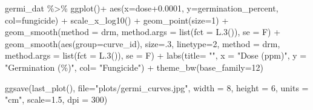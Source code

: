 \documentclass[
  letterpaper,
  DIV=11,
  numbers=noendperiod]{scrreport}
\newenvironment{Shaded}{\begin{snugshade}}{\end{snugshade}}
\newcommand{\AttributeTok}[1]{\textcolor[rgb]{0.40,0.45,0.13}{#1}}
\newcommand{\DecValTok}[1]{\textcolor[rgb]{0.68,0.00,0.00}{#1}}
\newcommand{\FloatTok}[1]{\textcolor[rgb]{0.68,0.00,0.00}{#1}}
\newcommand{\FunctionTok}[1]{\textcolor[rgb]{0.28,0.35,0.67}{#1}}
\newcommand{\NormalTok}[1]{\textcolor[rgb]{0.00,0.23,0.31}{#1}}
\newcommand{\SpecialCharTok}[1]{\textcolor[rgb]{0.37,0.37,0.37}{#1}}
\newcommand{\StringTok}[1]{\textcolor[rgb]{0.13,0.47,0.30}{#1}}
\begin{document}
\begin{Shaded}
\begin{Highlighting}[]
\NormalTok{germi\_dat }\SpecialCharTok{\%\textgreater{}\%} 
  \FunctionTok{ggplot}\NormalTok{()}\SpecialCharTok{+}
  \FunctionTok{aes}\NormalTok{(}\AttributeTok{x=}\NormalTok{dose}\FloatTok{+0.0001}\NormalTok{, }\AttributeTok{y=}\NormalTok{germination\_percent, }\AttributeTok{col=}\NormalTok{fungicide) }\SpecialCharTok{+}
  \FunctionTok{scale\_x\_log10}\NormalTok{() }\SpecialCharTok{+}
  \FunctionTok{geom\_point}\NormalTok{(}\AttributeTok{size=}\DecValTok{1}\NormalTok{) }\SpecialCharTok{+} 
  \FunctionTok{geom\_smooth}\NormalTok{(}\AttributeTok{method =}\NormalTok{ drm, }
              \AttributeTok{method.args =} \FunctionTok{list}\NormalTok{(}\AttributeTok{fct =} \FunctionTok{L.3}\NormalTok{()), }\AttributeTok{se =}\NormalTok{ F) }\SpecialCharTok{+}  
  \FunctionTok{geom\_smooth}\NormalTok{(}\FunctionTok{aes}\NormalTok{(}\AttributeTok{group=}\NormalTok{curve\_id), }\AttributeTok{size=}\NormalTok{.}\DecValTok{3}\NormalTok{, }\AttributeTok{linetype=}\DecValTok{2}\NormalTok{,  }
              \AttributeTok{method =}\NormalTok{ drm, }
              \AttributeTok{method.args =} \FunctionTok{list}\NormalTok{(}\AttributeTok{fct =} \FunctionTok{L.3}\NormalTok{()), }\AttributeTok{se =}\NormalTok{ F) }\SpecialCharTok{+}
  \FunctionTok{labs}\NormalTok{(}\AttributeTok{title=} \StringTok{""}\NormalTok{, }\AttributeTok{x =} \StringTok{"Dose (ppm)"}\NormalTok{,  }\AttributeTok{y =} \StringTok{"Germination (\%)"}\NormalTok{, }\AttributeTok{col=} \StringTok{"Fungicide"}\NormalTok{)  }\SpecialCharTok{+}
  \FunctionTok{theme\_bw}\NormalTok{(}\AttributeTok{base\_family=}\DecValTok{12}\NormalTok{)}
\end{Highlighting}
\end{Shaded}

\begin{Shaded}
\begin{Highlighting}[]
\FunctionTok{ggsave}\NormalTok{(}\FunctionTok{last\_plot}\NormalTok{(), }\AttributeTok{file=}\StringTok{"plots/germi\_curves.jpg"}\NormalTok{, }\AttributeTok{width =} \DecValTok{8}\NormalTok{, }\AttributeTok{height =} \DecValTok{6}\NormalTok{, }\AttributeTok{units =} \StringTok{"cm"}\NormalTok{, }\AttributeTok{scale=}\FloatTok{1.5}\NormalTok{, }\AttributeTok{dpi =} \DecValTok{300}\NormalTok{)}
\end{Highlighting}
\end{Shaded}
\end{document}
